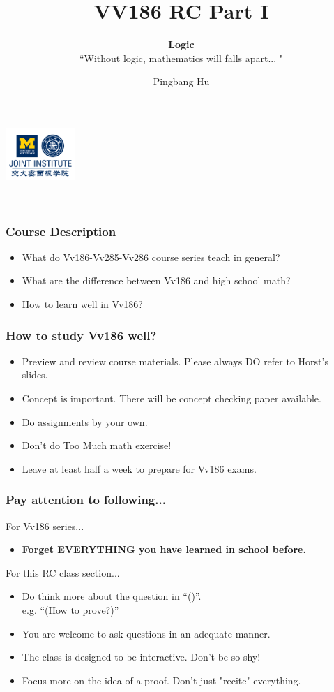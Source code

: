 \documentclass[12pt, t]{beamer}
\title{VV186 RC Part I}
\subtitle{\textbf{Logic}\\``Without logic, mathematics will falls apart... "}
\institute[UM-SJTU JI]{University of Michigan-Shanghai Jiao Tong University Joint Institute}
\author{Pingbang Hu}
\begin{document}
\begin{frame}
    \titlepage
    \begin{center}
        \includegraphics[height=2cm]{Figures/logo/logo2.png}
    \end{center}
\end{frame}

\begin{frame}
    \
    \frametitle{Course Description}
    \begin{itemize}
        \item What do Vv186-Vv285-Vv286 course series teach in general?
        \item What are the difference between Vv186 and high school math?
        \item How to learn well in Vv186?
    \end{itemize}
\end{frame}

\begin{frame}
    \frametitle{How to study Vv186 well?}
    \begin{itemize}
        \item Preview and review course materials. Please always DO refer to Horst's slides.
        \item Concept is important. There will be concept checking paper available.
        \item Do assignments by your own.
        \item Don't do Too Much math exercise!
        \item Leave at least half a week to prepare for Vv186 exams.
    \end{itemize}
\end{frame}

\begin{frame}
    \frametitle{Pay attention to following...}
    For Vv186 series...
    \begin{itemize}
        \item \textbf{Forget EVERYTHING you have learned in school before.}
    \end{itemize}

    For this RC class section...
    \begin{itemize}
        \item Do think more about the question in ``()''. \\e.g. ``(How to prove?)''
        \item You are welcome to ask questions in an adequate manner.
        \item The class is designed to be interactive. Don't be so shy!
        \item Focus more on the idea of a proof. Don't just "recite" everything.
    \end{itemize}
\end{frame}
\end{document}
